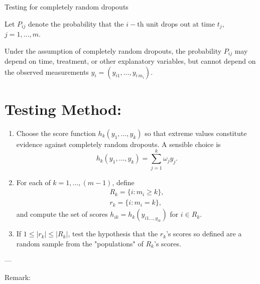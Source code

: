 \documentclass[UTF8,a4paper,10pt]{article}
\begin{document}



\begin{Problem}[]{Testing for completely random dropouts}

    Let \(P_{ij}\) denote the probability that the \(i-\)th unit drops out at time \(t_j\), \(j = 1,\ldots,m\).

    Under the assumption of completely random dropouts, the probability \(P_{ij}\) may depend on time, treatment, or other explanatory variables, but cannot depend on the observed measurements \(y_{i} = (y_{i1}, \ldots, y_{i\,m_i})\).

    \section*{Testing Method:}
    \begin{enumerate}[label=(\alph*)]
        \item Choose the score function \(h_{k}(y_{1},\ldots,y_{k})\) so that extreme values constitute evidence against completely random dropouts. A sensible choice is 
        \[h_{k}(y_{1},\ldots,y_{k}) = \sum_{j=1}^{k}\omega_{j}y_{j}.\]
        \item For each of \(k = 1, \ldots, (m-1)\), define
        \begin{align*}
            R_{k} = \{i:m_i\geq k\},\\
            r_{k} = \{i:m_i = k\},
        \end{align*}
        and compute the set of scores \(h_{ik} = h_k(y_{i1\ldots,y_{ik}})\) for \(i\in R_{k}\).
        \item If \(1\leq |r_k|\leq |R_k|\), test the hypothesis that the \(r_k\)'s scores so defined are a random sample from the "populations" of \(R_k\)'s scores.
    \end{enumerate}
---

Remark:


\end{Problem}
\end{document}
